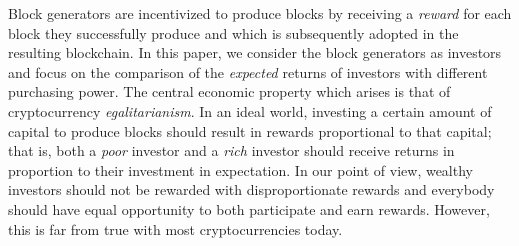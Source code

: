 Block generators are incentivized to produce blocks by receiving a
\emph{reward} for each block they successfully produce and which is
subsequently adopted in the resulting blockchain.
In this paper, we consider the block generators as investors and focus on the
comparison of the \emph{expected} returns of investors with different
purchasing power. The central economic property which arises is that of
cryptocurrency \emph{egalitarianism}. In an ideal world, investing a certain
amount of capital to produce blocks should result in rewards proportional to
that capital; that is, both a \emph{poor} investor and a \emph{rich} investor
should receive returns in proportion to their investment in expectation. In our point of view,
wealthy investors should not be rewarded
with disproportionate rewards and everybody should have equal opportunity to both participate
and earn rewards. However, this is far from true with most cryptocurrencies
today.

